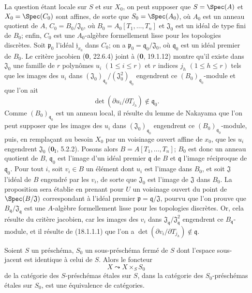 La question étant locale sur $S$ et sur $X_0$, on peut supposer que $S=\Spec(A)$ et $X_0=\Spec(C_0)$ sont affines, de sorte que $S_0=\Spec(A_0)$, où $A_0$ est un anneau quotient de $A$, $C_0=B_0/\mathfrak J_0$, où $B_0=A_0[T_1,\ldots,T_n]$ et $\mathfrak J_0$ est un idéal de type fini de $B_0$; enfin, $C_0$ est une $A_0$-algèbre formellement lisse pour les topologies discrètes. Soit $\mathfrak p_0$ l'idéal $\mathfrak j_{x_0}$ dans $C_0$; on a $\mathfrak p_0=\mathfrak q_0/\mathfrak J_0$, où $\mathfrak q_0$ est un idéal premier de $B_0$. Le critère jacobien (\textbf{0}, 22.6.4) joint à (\textbf{0}, 19.1.12) montre qu'il existe dans $\mathfrak J_0$ une famille de $r$ polynômes $u_i$ $(1\leq i\leq r)$ et $r$ indices $j_h$ $(1\leq h\leq r)$ tels que les images des $u_i$ dans $(\mathfrak J_0)_{\mathfrak q_0}/(\mathfrak J_0^2)_{\mathfrak q_0}$ engendrent ce $(B_0)_{\mathfrak q_0}$-module et que l'on ait
\begin{equation}
  \det(\partial u_i/\partial T_{j_h})\notin\mathfrak q_0.
  \tag{18.1.1.1}\label{IV.18.1.1.1}
\end{equation}
Comme $(B_0)_{\mathfrak q_0}$ est un anneau local, il résulte du lemme de Nakayama que l'on peut supposer que les images des $u_i$ dans $(\mathfrak J_0)_{\mathfrak q_0}$ engendrent ce $(B_0)_{\mathfrak q_0}$-module, puis, en remplaçant au besoin $X_0$ par un voisinage ouvert affine de $x_0$, que les $u_i$ engendrent $\mathfrak J_0$ ($\mathbf{0}_{\mathrm I}$, 5.2.2). Posons alors $B=A[T_1,\ldots,T_n]$; $B_0$ est donc un anneau quotient
de $B$, $\mathfrak q_0$ est l'image d'un idéal premier $\mathfrak q$ de $B$ et $\mathfrak q$ l'image réciproque de $\mathfrak q_0$. Pour tout $i$, soit $v_i\in B$ un élément dont $u_i$ est l'image dans $B_0$, et soit $\mathfrak J$ l'idéal de $B$ engendré par les $v_i$, de sorte que $\mathfrak J_0$ est l'image de $\mathfrak J$ dans $B_0$. La proposition sera établie en prenant pour $U$ un voisinage ouvert du point de $\Spec(B/\mathfrak J)$ correspondant à l'idéal premier $\mathfrak p=\mathfrak q/\mathfrak J$, pourvu que l'on prouve que $B_{\mathfrak q}/\mathfrak J_{\mathfrak q}$ est une $A$-algèbre formellement lisse pour les topologies discrètes. Or, cela résulte du critère jacobien, car les images des $v_i$ dans $\mathfrak J_{\mathfrak q}/\mathfrak J_{\mathfrak q}^2$ engendrent ce $B_{\mathfrak q}$-module, et il résulte de (18.1.1.1) que l'on a $\det(\partial v_i/\partial T_{j_h})\notin\mathfrak q$.

\begin{theorem}[18.1.2]
\label{IV.18.1.2}
Soient $S$ un préschéma, $S_0$ un sous-préschéma fermé de $S$ dont l'espace sous-jacent est identique à celui de $S$. Alors le foncteur
\[
  X\leadsto X\times_S S_0
\]
de la catégorie des $S$-préschémas étales sur $S$, dans la catégorie des $S_0$-préschémas étales sur $S_0$, est une équivalence de catégories.
\end{theorem}

